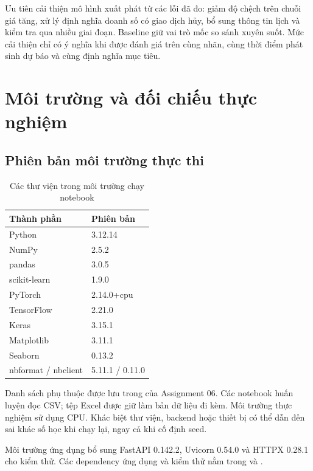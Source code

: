 \documentclass[12pt,a4paper]{report}
\begin{document}
Ưu tiên cải thiện mô hình xuất phát từ các lỗi đã đo: giảm độ chệch trên chuỗi giá tăng, xử lý định nghĩa doanh số có giao dịch hủy, bổ sung thông tin lịch và kiểm tra qua nhiều giai đoạn. Baseline giữ vai trò mốc so sánh xuyên suốt. Mức cải thiện chỉ có ý nghĩa khi được đánh giá trên cùng nhãn, cùng thời điểm phát sinh dự báo và cùng định nghĩa mục tiêu.

\appendix
\chapter{Môi trường và đối chiếu thực nghiệm}

\section{Phiên bản môi trường thực thi}
\begin{table}[H]\centering\small
\caption{Các thư viện trong môi trường chạy notebook}\label{tab:environment}
\begin{tabular}{@{}ll@{}}\toprule
Thành phần & Phiên bản \\\midrule
Python & 3.12.14 \\
NumPy & 2.5.2 \\
pandas & 3.0.5 \\
scikit-learn & 1.9.0 \\
PyTorch & 2.14.0+cpu \\
TensorFlow & 2.21.0 \\
Keras & 3.15.1 \\
Matplotlib & 3.11.1 \\
Seaborn & 0.13.2 \\
nbformat / nbclient & 5.11.1 / 0.11.0 \\\bottomrule
\end{tabular}
\end{table}

Danh sách phụ thuộc được lưu trong  của Assignment 06. Các notebook huấn luyện đọc CSV; tệp Excel được giữ làm bản dữ liệu đi kèm. Môi trường thực nghiệm sử dụng CPU. Khác biệt thư viện, backend hoặc thiết bị có thể dẫn đến sai khác số học khi chạy lại, ngay cả khi cố định seed.

Môi trường ứng dụng bổ sung FastAPI 0.142.2, Uvicorn 0.54.0 và HTTPX 0.28.1 cho kiểm thử. Các dependency ứng dụng và kiểm thử nằm trong  và .
\end{document}
